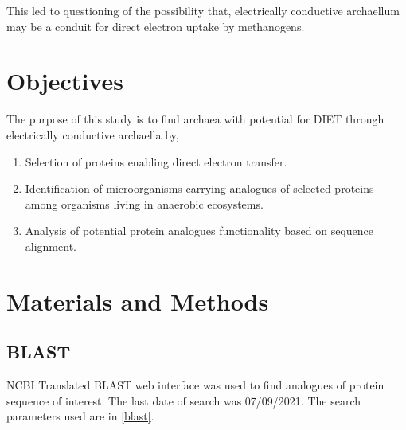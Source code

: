 \documentclass[fontsize=12pt,headsepline=true, bibliography=totocnumbered, twoside]{scrbook} %
\begin{document}
\vspace{0.3cm}
This led to questioning of the possibility that, electrically conductive archaellum may be a conduit for direct electron uptake by methanogens.








\chapter{Objectives}


The purpose of this study is to find archaea with potential for \acf{DIET} through electrically conductive archaella by,

\begin{enumerate}
    \item Selection of proteins enabling direct electron transfer.
    \item Identification of microorganisms carrying analogues of selected proteins among organisms living in anaerobic ecosystems.

\item Analysis of potential protein analogues functionality based on sequence alignment.

\end{enumerate}








\chapter{Materials and Methods}

\section[Basic local alignment search tool(BLAST)]{\ac{BLAST}}

\ac{NCBI} Translated \ac{BLAST} web interface was used to find analogues of protein sequence of interest\citep{madden2003blast}. The last date of search was 07/09/2021. The search parameters used are in \autoref{blast}.
\end{document}
